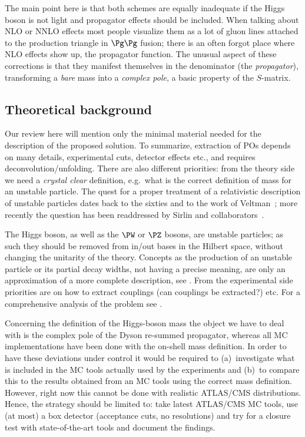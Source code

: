 The main point here is that both schemes are equally inadequate if the Higgs
boson is not light and propagator effects should be included. When talking
about NLO or NNLO effects most people visualize them as a lot of gluon lines
attached to the production triangle in $\Pg\Pg$ fusion; there is an often
forgot place where NLO  effects show up, the propagator function. The unusual
aspect of these corrections is that they manifest themselves in the denominator 
(the {\em propagator}), transforming a {\em bare} mass into a 
{\em complex pole}, a basic property of the $S$-matrix.
\subsection{Theoretical background}
Our review here will mention only the minimal material needed for the
description of the proposed solution.
To summarize, extraction of POs depends on many details, experimental cuts, 
detector effects etc., and requires deconvolution/unfolding.
There are also different priorities: from the theory side we need a {\em crystal
clear} definition, e.g.\ what is the correct definition of mass for an unstable
particle. 
The quest for a proper treatment of a relativistic description of unstable particles 
dates back to the sixties and to the work of Veltman~\cite{Veltman:1963th}; more 
recently the question has been readdressed by Sirlin and 
collaborators~\cite{Grassi:2000dz}.

The Higgs boson, as well as the $\PW$ or $\PZ$ bosons, are unstable 
particles; as such they should be removed from in/out bases in the
Hilbert space, without changing the unitarity of the theory. 
Concepts as the production of an unstable particle or its partial decay widths, 
not having a precise meaning, are only an approximation of a more complete 
description, see .
From the experimental side priorities are on how to extract couplings
(can couplings be extracted?) etc. For a comprehensive analysis of the problem 
see .

Concerning the definition of the Higgs-boson mass the object we have to deal
with is the complex pole of the Dyson re-summed propagator, 
whereas all MC implementations have been done with the on-shell mass definition.
In order to have these deviations under control it would be required
to (a)~investigate what is included in the MC tools actually used by the
experiments and (b)~to compare this to the results obtained from an MC tools
using the correct mass definition.
However, right now this cannot be done with realistic ATLAS/CMS distributions.
Hence, the strategy should be limited to: take latest ATLAS/CMS MC tools, use
(at most) a box detector (acceptance cuts, no resolutions) and try for a
closure test with state-of-the-art tools and document the findings.

